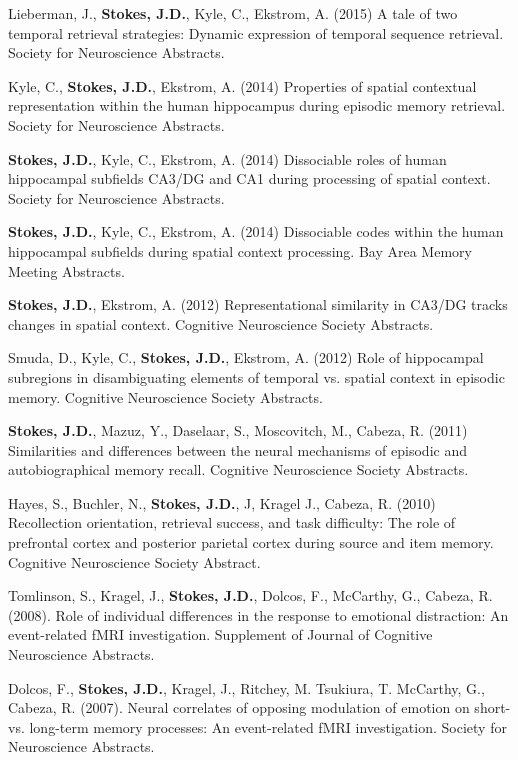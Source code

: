 \documentclass[line,margin,10pt]{res}
\begin{document}
\begin{resume}
Lieberman, J., \textbf{Stokes, J.D.}, Kyle, C., Ekstrom, A. (2015) A tale of two temporal retrieval strategies: Dynamic expression of temporal sequence retrieval. Society for Neuroscience Abstracts.

Kyle, C., \textbf{Stokes, J.D.}, Ekstrom, A. (2014) Properties of spatial contextual representation within the human hippocampus during episodic memory retrieval. Society for Neuroscience Abstracts.

\textbf{Stokes, J.D.}, Kyle, C., Ekstrom, A. (2014) Dissociable roles of human hippocampal subfields CA3/DG and CA1 during processing of spatial context. Society for Neuroscience Abstracts.

\textbf{Stokes, J.D.}, Kyle, C., Ekstrom, A. (2014) Dissociable codes within the human hippocampal subfields during spatial context processing. Bay Area Memory Meeting Abstracts.

\textbf{Stokes, J.D.}, Ekstrom, A. (2012) Representational similarity in CA3/DG tracks changes in spatial context. Cognitive Neuroscience Society Abstracts.
 	
Smuda, D., Kyle, C., \textbf{Stokes, J.D.}, Ekstrom, A. (2012) Role of hippocampal subregions in disambiguating elements of temporal vs. spatial context in episodic memory. Cognitive Neuroscience Society Abstracts.
 	
\textbf{Stokes, J.D.}, Mazuz, Y., Daselaar, S., Moscovitch, M., Cabeza, R. (2011) Similarities and differences between the neural mechanisms of episodic and autobiographical memory recall. Cognitive Neuroscience Society Abstracts.
 	
Hayes, S., Buchler, N., \textbf{Stokes, J.D.}, J, Kragel J.,  Cabeza, R. (2010) Recollection orientation, retrieval success, and task difficulty: The role of prefrontal cortex and posterior parietal cortex during source and item memory. Cognitive Neuroscience Society Abstract.
 	
Tomlinson, S., Kragel, J., \textbf{Stokes, J.D.}, Dolcos, F., McCarthy, G., Cabeza, R. (2008). Role of individual differences in the response to emotional distraction: An event-related fMRI investigation. Supplement of Journal of Cognitive Neuroscience Abstracts.
 	
Dolcos, F., \textbf{Stokes, J.D.}, Kragel, J., Ritchey, M. Tsukiura, T. McCarthy, G., Cabeza, R. (2007). Neural correlates of opposing modulation of emotion on short- vs. long-term memory processes: An event-related fMRI investigation. Society for Neuroscience Abstracts.

\end{resume}
\end{document}
